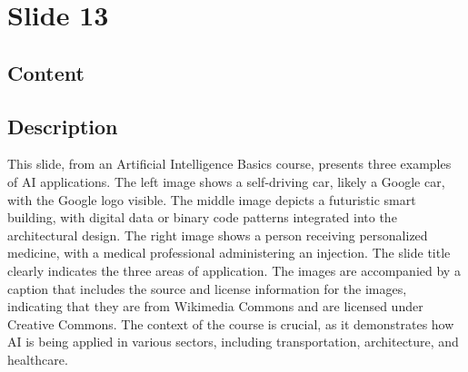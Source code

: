 \documentclass{article}%
\begin{document}
%
\newpage%
\section{Slide 13}%
\label{sec:Slide13}%
\subsection{Content}%
%
\subsection{Description}%
This slide, from an Artificial Intelligence Basics course, presents three examples of AI applications.  The left image shows a self-driving car, likely a Google car, with the Google logo visible. The middle image depicts a futuristic smart building, with digital data or binary code patterns integrated into the architectural design. The right image shows a person receiving personalized medicine, with a medical professional administering an injection.  The slide title clearly indicates the three areas of application.  The images are accompanied by a caption that includes the source and license information for the images, indicating that they are from Wikimedia Commons and are licensed under Creative Commons.  The context of the course is crucial, as it demonstrates how AI is being applied in various sectors, including transportation, architecture, and healthcare.%
\end{document}
